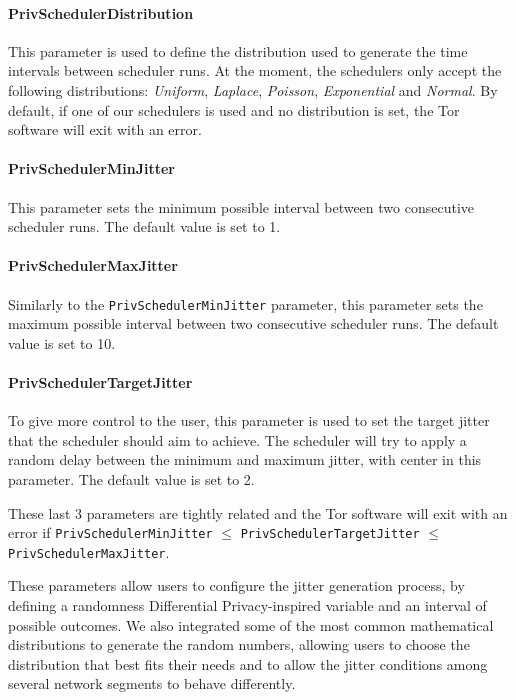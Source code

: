 \paragraph{PrivSchedulerDistribution} This parameter is used to define the distribution used to generate the time intervals between scheduler runs. At the moment, the schedulers only accept the following distributions: \textit{Uniform}, \textit{Laplace}, \textit{Poisson}, \textit{Exponential} and \textit{Normal}. By default, if one of our schedulers is used and no distribution is set, the Tor software will exit with an error.

\paragraph{PrivSchedulerMinJitter} This parameter sets the minimum possible interval between two consecutive scheduler runs. The default value is set to 1.

\paragraph{PrivSchedulerMaxJitter} Similarly to the \texttt{PrivSchedulerMinJitter} parameter, this parameter sets the maximum possible interval between two consecutive scheduler runs. The default value is set to 10. 

\paragraph{PrivSchedulerTargetJitter} To give more control to the user, this parameter is used to set the target jitter that the scheduler should aim to achieve. The scheduler will try to apply a random delay between the minimum and maximum jitter, with center in this parameter. The default value is set to 2.\linebreak

These last 3 parameters are tightly related and the Tor software will exit with an error if \texttt{PrivSchedulerMinJitter} $\le$ \texttt{PrivSchedulerTargetJitter} $\le$ \texttt{PrivSchedulerMaxJitter}.

These parameters allow users to configure the jitter generation process, by defining a randomness Differential Privacy-inspired variable and an interval of possible outcomes. We also integrated some of the most common mathematical distributions to generate the random numbers, allowing users to choose the distribution that best fits their needs and to allow the jitter conditions among several network segments to behave differently.  

